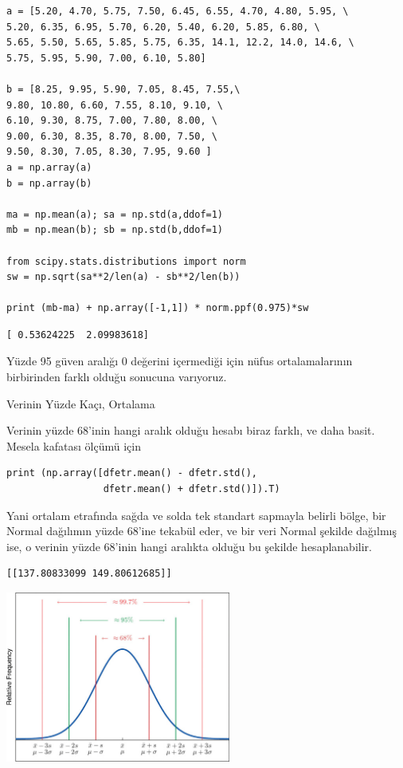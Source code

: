 \documentclass[12pt,fleqn]{article}\usepackage{../../common}
\begin{document}
\begin{verbatim}
a = [5.20, 4.70, 5.75, 7.50, 6.45, 6.55, 4.70, 4.80, 5.95, \
5.20, 6.35, 6.95, 5.70, 6.20, 5.40, 6.20, 5.85, 6.80, \
5.65, 5.50, 5.65, 5.85, 5.75, 6.35, 14.1, 12.2, 14.0, 14.6, \
5.75, 5.95, 5.90, 7.00, 6.10, 5.80]

b = [8.25, 9.95, 5.90, 7.05, 8.45, 7.55,\
9.80, 10.80, 6.60, 7.55, 8.10, 9.10, \
6.10, 9.30, 8.75, 7.00, 7.80, 8.00, \
9.00, 6.30, 8.35, 8.70, 8.00, 7.50, \
9.50, 8.30, 7.05, 8.30, 7.95, 9.60 ]
a = np.array(a)
b = np.array(b)

ma = np.mean(a); sa = np.std(a,ddof=1)
mb = np.mean(b); sb = np.std(b,ddof=1)

from scipy.stats.distributions import norm
sw = np.sqrt(sa**2/len(a) - sb**2/len(b))

print (mb-ma) + np.array([-1,1]) * norm.ppf(0.975)*sw
\end{verbatim}

\begin{verbatim}
[ 0.53624225  2.09983618]
\end{verbatim}

Yüzde 95 güven aralığı 0 değerini içermediği için nüfus ortalamalarının
birbirinden farklı olduğu sonucuna varıyoruz.

Verinin Yüzde Kaçı, Ortalama

Verinin yüzde 68'inin hangi aralık olduğu hesabı biraz farklı, ve
daha basit. Mesela kafatası ölçümü için

\begin{verbatim}
print (np.array([dfetr.mean() - dfetr.std(),
                 dfetr.mean() + dfetr.std()]).T)
\end{verbatim}

Yani ortalam etrafında sağda ve solda tek standart sapmayla belirli bölge,
bir Normal dağılımın yüzde 68'ine tekabül eder, ve bir veri Normal şekilde
dağılmış ise, o verinin yüzde 68'inin hangi aralıkta olduğu bu şekilde
hesaplanabilir.

\begin{verbatim}
[[137.80833099 149.80612685]]
\end{verbatim}

\includegraphics[width=20em]{areanorm2.jpg}
\end{document}
